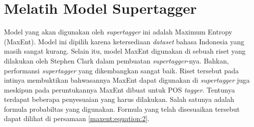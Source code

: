 
\section{Melatih Model Supertagger}

Model yang akan digunakan oleh \textit{supertagger} ini adalah Maximum Entropy (MaxEnt).
Model ini dipilih karena ketersediaan \textit{dataset} bahasa Indonesia yang masih sangat kurang.
Selain itu, model MaxEnt digunakan di sebuah riset yang dilakukan oleh Stephen Clark dalam
pembuatan \textit{supertagger}-nya.
Bahkan, performansi \textit{supertagger} yang dikembangkan sangat baik.
Riset tersebut pada intinya membuktikan bahwasannya MaxEnt dapat digunakan di \textit{supertagger}
juga meskipun pada peruntukannya MaxEnt dibuat untuk POS \textit{tagger}.
Tentunya terdapat beberapa penyesuaian yang harus dilakukan.
Salah satunya adalah formula probabiltas yang digunakan.
Formula yang telah disesuaikan tersebut dapat dilihat di persamaan \ref{maxent:equation:2}.
